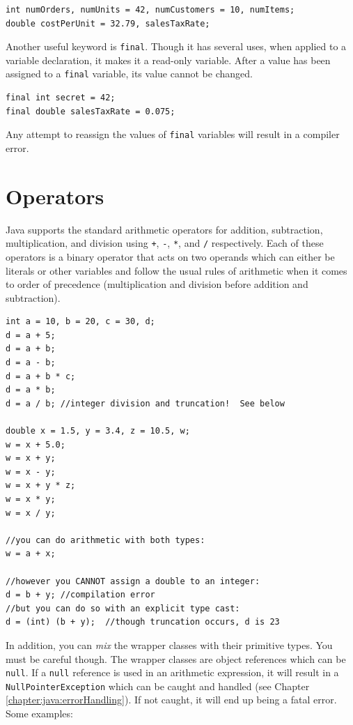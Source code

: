 \begin{verbatim}
int numOrders, numUnits = 42, numCustomers = 10, numItems;
double costPerUnit = 32.79, salesTaxRate;
\end{verbatim}

Another useful keyword is \texttt{final}.  Though it has several uses, 
when applied to a variable declaration, it makes it a read-only variable.  After a
value has been assigned to a \texttt{final} variable, its value cannot
be changed.  

\begin{verbatim}
final int secret = 42;
final double salesTaxRate = 0.075;
\end{verbatim}

Any attempt to reassign the values of \texttt{final} variables will result
in a compiler error.

\section{Operators}

Java supports the standard arithmetic operators for addition, subtraction, multiplication, and
division using \texttt{+}, \texttt{-}, \texttt{*}, and
\texttt{/} respectively.  Each of these operators is a binary operator that
acts on two operands which can either be literals or other variables and follow
the usual rules of arithmetic when it comes to order of precedence (multiplication 
and division before addition and subtraction).

\begin{verbatim}
int a = 10, b = 20, c = 30, d;
d = a + 5;
d = a + b;
d = a - b;
d = a + b * c;
d = a * b;
d = a / b; //integer division and truncation!  See below

double x = 1.5, y = 3.4, z = 10.5, w;
w = x + 5.0;
w = x + y;
w = x - y;
w = x + y * z;
w = x * y;
w = x / y;

//you can do arithmetic with both types:
w = a + x;

//however you CANNOT assign a double to an integer:
d = b + y; //compilation error
//but you can do so with an explicit type cast:
d = (int) (b + y);  //though truncation occurs, d is 23
\end{verbatim}

In addition, you can \emph{mix} the wrapper classes with their primitive types.
You must be careful though.  The wrapper classes are object references which
can be \texttt{null}.  If a \texttt{null} reference is used
in an arithmetic expression, it will result in a \texttt{NullPointerException}
which can be caught and handled (see Chapter \ref{chapter:java:errorHandling}).  
If not caught, it will end up being a fatal
error.  Some examples:

